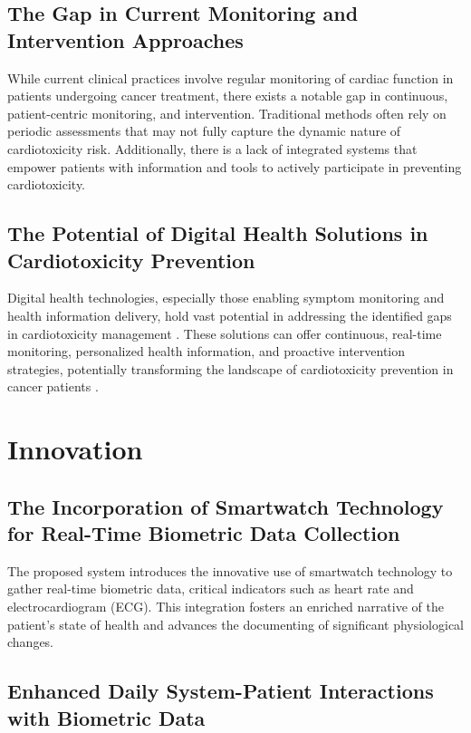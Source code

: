 \documentclass[11pt]{article}
\begin{document}
\subsection{The Gap in Current Monitoring and Intervention Approaches} While current
clinical practices involve regular monitoring of cardiac function in patients
undergoing cancer treatment, there exists a notable gap in continuous,
patient-centric monitoring, and intervention. Traditional methods often rely on
periodic assessments that may not fully capture the dynamic nature of
cardiotoxicity risk. Additionally, there is a lack of integrated systems that
empower patients with information and tools to actively participate in
preventing cardiotoxicity.

\subsection{The Potential of Digital Health Solutions in Cardiotoxicity Prevention}
Digital health technologies, especially those enabling symptom monitoring and
health information delivery, hold vast potential in addressing the identified
gaps in cardiotoxicity management . These solutions can offer continuous,
real-time monitoring, personalized health information, and proactive
intervention strategies, potentially transforming the landscape of
cardiotoxicity prevention in cancer patients \cite{sturgeonPopulationbasedStudyCardiovascular2019}.

\section{Innovation}

\subsection{The Incorporation of Smartwatch Technology for Real-Time Biometric Data Collection}

The proposed system introduces the innovative use of smartwatch technology to gather real-time biometric data, critical indicators such as heart rate and electrocardiogram (ECG). This integration fosters an enriched narrative of the patient's state of health and advances the documenting of significant physiological changes.

\subsection{Enhanced Daily System-Patient Interactions with Biometric Data}
\end{document}
